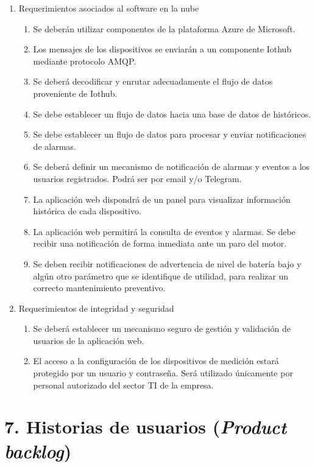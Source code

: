 \documentclass[
11pt, %
]{charter}
\begin{document}
\begin{enumerate}
	\item Requerimientos asociados al software en la nube
		\begin{enumerate}
			\item Se deberán utilizar componentes de la plataforma Azure de Microsoft.
			\item Los mensajes de los dispositivos se enviarán a un componente Iothub mediante protocolo AMQP.
			\item Se deberá decodificar y enrutar adecuadamente el flujo de datos proveniente de Iothub.
			\item Se debe establecer un flujo de datos hacia una base de datos de históricos.
			\item Se debe establecer un flujo de datos para procesar y enviar notificaciones de alarmas.
			\item Se deberá definir un mecanismo de notificación de alarmas y eventos a los usuarios registrados. Podrá ser por email y/o Telegram.
			\item La aplicación web dispondrá de un panel para visualizar información histórica de cada dispositivo.
			\item La aplicación web permitirá la consulta de eventos y alarmas.
Se debe recibir una notificación de forma inmediata ante un paro del motor.
			\item Se deben recibir notificaciones de advertencia de nivel de batería bajo y algún otro parámetro que se identifique de utilidad, para realizar un correcto mantenimiento preventivo.
		\end{enumerate}

	\item Requerimientos de integridad y seguridad
		\begin{enumerate}
			\item Se deberá establecer un mecanismo seguro de gestión y validación de usuarios de la aplicación web.
			\item El acceso a la configuración de los dispositivos de medición estará protegido por un usuario y contraseña. Será utilizado únicamente por personal autorizado del sector TI de la empresa.
		\end{enumerate}
	\end{enumerate}



\section{7. Historias de usuarios (\textit{Product backlog})}
\label{sec:backlog}
\end{document}
